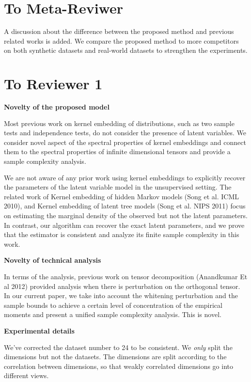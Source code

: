 \documentclass{article}
\begin{document}
\section*{To Meta-Reviwer}
A discussion about the difference between the proposed method and previous related works is added. We compare the proposed method to more competitors on both synthetic datasets and real-world datasets to strengthen the experiments.

\section*{To Reviewer 1}

\textbf{Novelty of the proposed model}

Most previous work on kernel embedding of distributions, such as two sample tests and independence tests, do not consider the presence of latent variables. We consider novel aspect of the spectral properties of kernel embeddings and connect them to the spectral properties of infinite dimensional tensors and provide a sample complexity analysis.

We are not aware of any prior work using kernel embeddings to explicitly recover the parameters of the latent variable model in the unsupervised setting. The related work of Kernel embedding of hidden Markov models (Song et al. ICML 2010), and Kernel embedding of latent tree models (Song et al. NIPS 2011) focus on estimating the marginal density of the observed but not the latent parameters. In contrast, our algorithm can recover the exact latent parameters, and we prove that the estimator is consistent and analyze its finite sample complexity in this work.

\textbf{Novelty of technical analysis}

In terms of the analysis, previous work on tensor decomposition (Anandkumar Et al 2012) provided analysis when there is perturbation on the orthogonal tensor. In our current paper, we take into account the whitening perturbation and the sample bounds to achieve a certain level of concentration of the empirical moments and present a unified sample complexity analysis. This is novel.

\textbf{Experimental details}

We've corrected the dataset number to 24 to be consistent. We \emph{only} split the dimensions but not the datasets. The dimensions are split according to the correlation between dimensions, so that weakly correlated dimensions go into different views.
\end{document}

